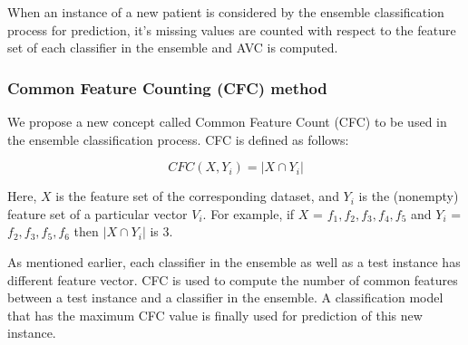 When an instance of a new patient is considered by the ensemble classification process for prediction, it's missing values are counted with respect to the feature set of each classifier in the ensemble and AVC is computed. 

\subsubsection{Common Feature Counting (CFC) method} \label{sec:CFCMethod}
We propose a new concept called Common Feature Count (CFC) to be used in the ensemble classification process. CFC is defined as follows:

\begin{equation} \label{CFCEquation}
CFC(X,Y_i) = |X \cap Y_i|
\end{equation}

Here, $X$ is the feature set of the corresponding dataset, and $Y_i$ is the (nonempty) feature set of a particular vector $V_i$. For example, if $X$ = {$f_1, f_2, f_3, f_4, f_5$} and $Y_i$ = {$f_2, f_3, f_5, f_6$} then $|X \cap Y_i|$ is 3.

As mentioned earlier, each classifier in the ensemble as well as a test instance has different feature vector. CFC is used to compute the number of common features between a test instance and a classifier in the ensemble. A classification model that has the maximum CFC value is finally used for prediction of this new instance.




